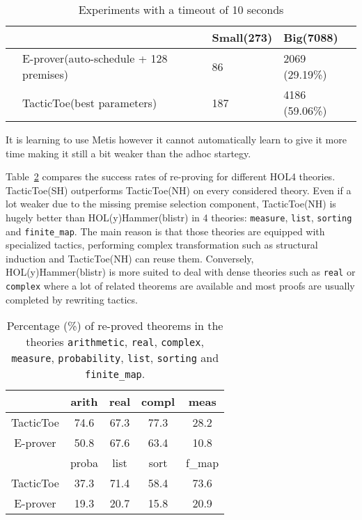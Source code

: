\documentclass[runningheads,a4paper,draft]{svjour3}
\def\holfour{\textsf{HOL4}\xspace}
\def\eprover{\textsf{E-prover}\xspace}
\def\holyhammer{\textsf{HOL(y)Hammer}\xspace}
\def\metis{\textsf{Metis}\xspace}
\def\tactictoe{\textsf{TacticToe}\xspace}
\newcommand{\ra}[1]{\renewcommand{\arraystretch}{#1}}
\begin{document}
\begin{table}[h!]
\centering\ra{1.3}
\small
\begin{tabular}{llll}
\toprule
  & & Small(273) & Big(7088) \\
\midrule
  & \eprover (auto-schedule + 128 premises) & 86 & 2069 (29.19\%)\\ 
  & \tactictoe (best parameters) & 187 & 4186 (59.06\%) \\
\bottomrule
\end{tabular}
\caption{Experiments with a timeout of 10 seconds \label{tab:_param}}
\end{table}

It is learning to use \metis however it cannot automatically learn to give it 
more time making it still a bit weaker than the adhoc startegy.



Table~\ref{theories} compares the success rates of re-proving for different
\holfour theories. \tactictoe(SH) outperforms \tactictoe(NH) on every 
considered theory.
Even if a lot weaker due to the missing premise selection component, 
\tactictoe(NH)
is hugely better than \holyhammer(blistr) in 4 theories: \texttt{measure}, 
\texttt{list}, \texttt{sorting} and \texttt{finite\_map}. The main reason is 
that 
those theories are equipped with specialized tactics, performing complex 
transformation such as structural induction and \tactictoe(NH) can reuse them. 
Conversely, \holyhammer(blistr) is more suited to deal with dense theories such 
as 
\texttt{real} or \texttt{complex} where a lot of related theorems are available 
and 
most proofs are usually completed by rewriting tactics.

\begin{table}[]
\centering
\setlength{\tabcolsep}{3mm}
\begin{tabular}{@{}ccccc@{}}
\toprule
\phantom{ab} & {arith} & {real} & {compl} 
& {meas} \\
\midrule
\tactictoe & 74.6 & 67.3 & 77.3 & 28.2\\
\eprover & 50.8 & 67.6 & 63.4 & 10.8 \\
\midrule
\phantom{abc}  & {proba} & {list} & {sort} & {f\_map} \\
\midrule
\tactictoe & 37.3 & 71.4 & 58.4 & 73.6 \\
\eprover & 19.3 & 20.7 & 15.8 & 20.9 \\
\bottomrule
\end{tabular}
\caption{\label{theories}Percentage (\%) of re-proved theorems in the theories 
\texttt{arithmetic}, \texttt{real}, \texttt{complex}, \texttt{measure},  
\texttt{probability}, \texttt{list}, \texttt{sorting} and \texttt{finite\_map}. 
}
\end{table}  
\end{document}

